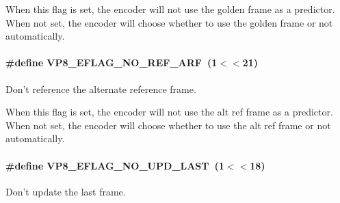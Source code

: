 \-When this flag is set, the encoder will not use the golden frame as a predictor. \-When not set, the encoder will choose whether to use the golden frame or not automatically. \hypertarget{group__vp8__encoder_ga650ab0baea12be91082226a5cc18776a}{
\paragraph[{\-V\-P8\-\_\-\-E\-F\-L\-A\-G\-\_\-\-N\-O\-\_\-\-R\-E\-F\-\_\-\-A\-R\-F}]{\setlength{\rightskip}{0pt plus 5cm}\#define \-V\-P8\-\_\-\-E\-F\-L\-A\-G\-\_\-\-N\-O\-\_\-\-R\-E\-F\-\_\-\-A\-R\-F~(1$<$$<$21)}}
\label{group__vp8__encoder_ga650ab0baea12be91082226a5cc18776a}


\-Don't reference the alternate reference frame. 

\-When this flag is set, the encoder will not use the alt ref frame as a predictor. \-When not set, the encoder will choose whether to use the alt ref frame or not automatically. \hypertarget{group__vp8__encoder_ga602edb6b02a89cb2db7a16d6dffba583}{
\paragraph[{\-V\-P8\-\_\-\-E\-F\-L\-A\-G\-\_\-\-N\-O\-\_\-\-U\-P\-D\-\_\-\-L\-A\-S\-T}]{\setlength{\rightskip}{0pt plus 5cm}\#define \-V\-P8\-\_\-\-E\-F\-L\-A\-G\-\_\-\-N\-O\-\_\-\-U\-P\-D\-\_\-\-L\-A\-S\-T~(1$<$$<$18)}}
\label{group__vp8__encoder_ga602edb6b02a89cb2db7a16d6dffba583}


\-Don't update the last frame. 

